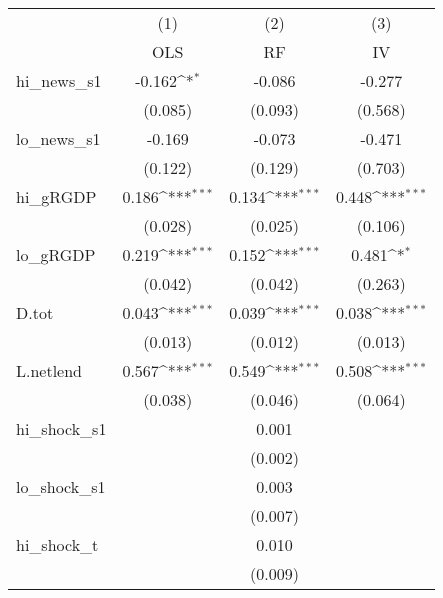 {
\def\sym#1{\ifmmode^{#1}\else\(^{#1}\)\fi}
\begin{tabular}{l*{3}{c}}
\toprule
            &\multicolumn{1}{c}{(1)}&\multicolumn{1}{c}{(2)}&\multicolumn{1}{c}{(3)}\\
            &\multicolumn{1}{c}{OLS}&\multicolumn{1}{c}{RF}&\multicolumn{1}{c}{IV}\\
\midrule
hi\_news\_s1  &      -0.162\sym{*}  &      -0.086         &      -0.277         \\
            &     (0.085)         &     (0.093)         &     (0.568)         \\
\addlinespace
lo\_news\_s1  &      -0.169         &      -0.073         &      -0.471         \\
            &     (0.122)         &     (0.129)         &     (0.703)         \\
\addlinespace
hi\_gRGDP    &       0.186\sym{***}&       0.134\sym{***}&       0.448\sym{***}\\
            &     (0.028)         &     (0.025)         &     (0.106)         \\
\addlinespace
lo\_gRGDP    &       0.219\sym{***}&       0.152\sym{***}&       0.481\sym{*}  \\
            &     (0.042)         &     (0.042)         &     (0.263)         \\
\addlinespace
D.tot       &       0.043\sym{***}&       0.039\sym{***}&       0.038\sym{***}\\
            &     (0.013)         &     (0.012)         &     (0.013)         \\
\addlinespace
L.netlend   &       0.567\sym{***}&       0.549\sym{***}&       0.508\sym{***}\\
            &     (0.038)         &     (0.046)         &     (0.064)         \\
\addlinespace
hi\_shock\_s1 &                     &       0.001         &                     \\
            &                     &     (0.002)         &                     \\
\addlinespace
lo\_shock\_s1 &                     &       0.003         &                     \\
            &                     &     (0.007)         &                     \\
\addlinespace
hi\_shock\_t  &                     &       0.010         &                     \\
            &                     &     (0.009)         &                     \\

\end{tabular}}
